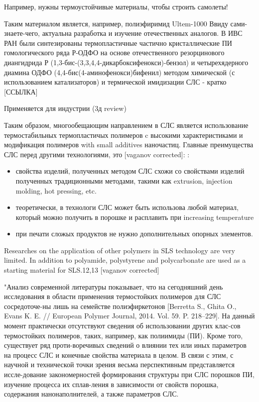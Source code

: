 Например, нужны термоустойчивые материалы, чтобы строить самолеты!

Таким материалом является, например, полиэфиримид Ultem-1000  Ввиду сами-знаете-чего, актуальна разработка и изучение отечественных аналогов. В ИВС РАН были синтезированы термопластичные частично кристаллические ПИ гомологического ряда Р-ОДФО на основе отечественного резорцинового диангидрида Р (1,3-бис-(3,3,4,4-дикарбоксифенокси)-бензол) и четырехядерного диамина ОДФО (4,4-бис(4-аминофенокси)бифенил) методом химической (с использованием катализаторов) и термической имидизации \cite{yudin-red}
СЛС - кратко [ССЫЛКА]

Применяется для индустрии (3д review)


Таким образом, многообещающим направлением в СЛС является использование  термостабильных термопластичых полимеров c высокими характеристиками и модификация полимеров with small additives наночастиц.
Главные преимущества СЛС перед другими технологиями, это 	[vaganov corrected]:
:
\begin{itemize}
    \item свойства изделий, полученных методом СЛС схожи со свойствами изделий полученных традиционными методами, такими как extrusion, injection molding, hot pressing, etc.
    \item теоретически, в технологи СЛС может быть использова любой материал, который можно получить в порошке и расплавить при increasing temperature
    \item при печати сложых продуктов не нужно дополнительных опорных элементов.
\end{itemize}

	Researches on the application of other polymers in SLS technology are very limited. In addition to polyamide, polystyrene and polycarbonate are used as a starting material for SLS.12,13
	[vaganov corrected]
	
	"Анализ современной литературы показывает, что на сегодняшний день исследования в области применения термостойких полимеров для СЛС сосредоточе-ны лишь на семействе полиэфиркетонов [Berretta S., Ghita O., Evans K. E. // European Polymer Journal, 2014. Vol. 59. P. 218–229]. На данный момент практически отсутствуют сведения об использовании других клас-сов термостойких полимеров, таких, например, как полиимиды (ПИ). Кроме того, существует ряд проти-воречивых сведений о влиянии тех или иных параметров на процесс СЛС и конечные свойства материала в целом. В связи с этим, с научной и технической точки зрения весьма перспективным представляется иссле-дование закономерностей формирования структуры при СЛС порошков ПИ, изучение процесса их сплав-ления в зависимости от свойств порошка, содержания нанонаполнителей, а также параметров СЛС.
\cite{yudin-red}
	
